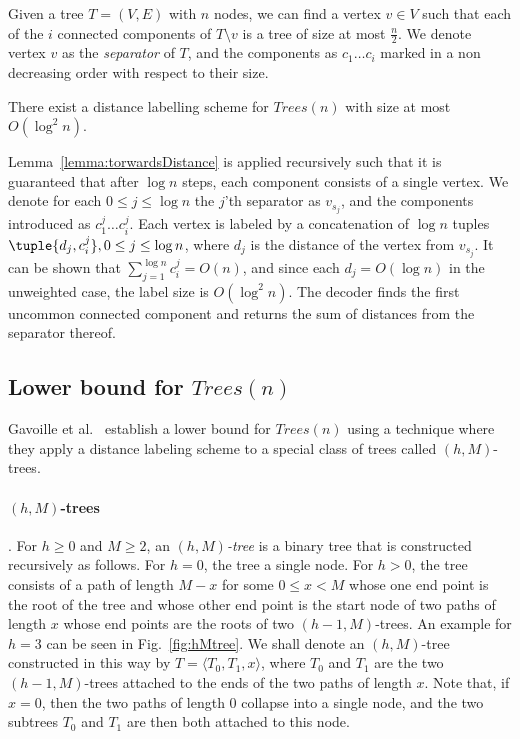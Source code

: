 		\begin{lemma}\label{lemma:torwardsDistance}
		Given a tree $T=(V,E)$ with $n$ nodes, we can find a vertex $v \in V$ such that each of the $i$ connected components of $T \setminus v$ is a tree of size at most $\frac{n}{2}$.
		We denote vertex $v$ as the \emph{separator}  of $T$, and the components as $c_1 \dots c_i$ marked in a non decreasing order with respect to their size.
		\end{lemma}
		
		\begin{thm}\label{thm:distance-upper}
		There exist a distance labelling scheme for $Trees(n)$ with size at most $O(\log^2 n)$.
		\end{thm}
		\begin{notproof}
		Lemma~\ref{lemma:torwardsDistance} is  applied recursively such that it is guaranteed that after $\log n$ steps, each component consists of a single vertex.
		We denote for each $0 \leq j \leq \log n$  the $j$'th separator as $v_{s_j}$, and the components introduced as $c_1^j \dots c_i^j$.
		Each vertex is labeled by  a concatenation of $\log n$ tuples $ \tuple{d_j,c_i^j}, 0 \leq j \leq \log n $, where  $d_j$ is  the distance of the vertex from $v_{s_j}$.
		It can be shown that $\sum_{j=1}^{\log n}c_i^j=O(n)$, and since each $d_j=O(\log n)$ in the unweighted case,  the label size is $O(\log^2 n)$.
		The decoder finds the first uncommon connected component and returns the sum of distances from the separator thereof.
		\end{notproof}


\subsection{Lower bound for $Trees(n)$}
Gavoille et al.~\cite{gavoillea2004distance,Gavoille2001} establish a lower bound for $Trees(n)$ using a technique where they apply a distance labeling scheme to a special class of trees called $(h,M)$-trees. 
\paragraph{$(h,M)$-trees}.
 For $h\geq 0$ and $M\geq 2$, an \emph{$(h,M)$-tree} is a binary tree that is constructed recursively as follows. 
 For $h=0$, the tree  a single node. For $h>0$, the tree consists of a path of length $M-x$ for some $0\leq x<M$ whose one end point is the root of the tree and whose other end point is the start node of two paths of length $x$ whose end points are the roots of two $(h-1,M)$-trees. An example for $h=3$ can be seen in  Fig.~\ref{fig:hMtree}.  We shall denote an $(h,M)$-tree constructed in this way by $T=\langle T_0,T_1,x\rangle$, where $T_0$ and $T_1$ are the two $(h-1,M)$-trees attached to the ends of the two paths of length $x$. Note that, if $x=0$, then the two paths of length $0$ collapse into a single node, and the two subtrees $T_0$ and $T_1$ are then both attached to this node.

